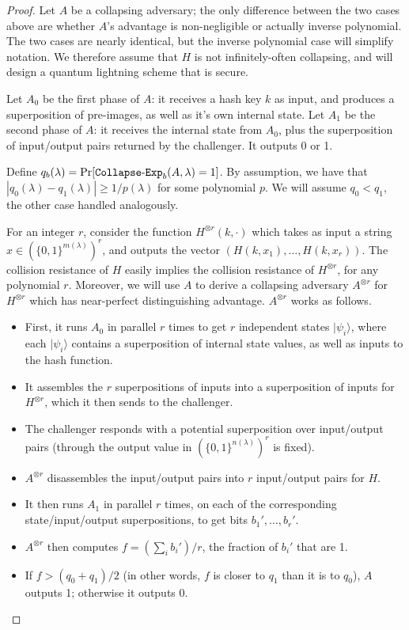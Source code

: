 \begin{proof} Let $A$ be a collapsing adversary; the only difference between the two cases above are whether $A$'s advantage is non-negligible or actually inverse polynomial.  The two cases are nearly identical, but the inverse polynomial case will simplify notation.  We therefore assume that $H$ is not infinitely-often collapsing, and will design a quantum lightning scheme that is secure.
	
Let $A_0$ be the first phase of $A$: it receives a hash key $k$ as input, and produces a superposition of pre-images, as well as it's own internal state.  Let $A_1$ be the second phase of $A$: it receives the internal state from $A_0$, plus the superposition of input/output pairs returned by the challenger.  It outputs 0 or 1.	

Define $q_b(\lambda)=\Pr[{\tt{Collapse\text{-}Exp}}_b(A,\lambda)=1]$.  By assumption, we have that $|q_0(\lambda)-q_1(\lambda)|\geq 1/p(\lambda)$ for some polynomial $p$.  We will assume $q_0<q_1$, the other case handled analogously.  

For an integer $r$, consider the function $H^{\otimes r}(k,\cdot)$ which takes as input a string $x\in(\{0,1\}^{m(\lambda)})^r$, and outputs the vector $(H(k,x_1),\dots,H(k,x_r))$.  The collision resistance of $H$ easily implies the collision resistance of $H^{\otimes r}$, for any polynomial $r$.  Moreover, we will use $A$ to derive a collapsing adversary $A^{\otimes r}$ for $H^{\otimes r}$ which has near-perfect distinguishing advantage.  $A^{\otimes r}$ works as follows.

\begin{itemize}
	\item First, it runs $A_0$ in parallel $r$ times to get $r$ independent states $|\psi_i\rangle$, where each $|\psi_i\rangle$ contains a superposition of internal state values, as well as inputs to the hash function.
	\item It assembles the $r$ superpositions of inputs into a superposition of inputs for $H^{\otimes r}$, which it then sends to the challenger.
	\item The challenger responds with a potential superposition over input/output pairs (through the output value in $(\{0,1\}^{n(\lambda)})^r$ is fixed).  
	\item $A^{\otimes r}$ disassembles the input/output pairs into $r$ input/output pairs for $H$.  
	\item It then runs $A_1$ in parallel $r$ times, on each of the corresponding state/input/output superpositions, to get bits $b_1',\dots,b_r'$.
	\item $A^{\otimes r}$ then computes $f=(\sum_i b_i')/r$, the fraction of $b_i'$ that are 1.
	\item If $f>(q_0+q_1)/2$ (in other words, $f$ is closer to $q_1$ than it is to $q_0$), $A$ outputs 1; otherwise it outputs 0.
\end{itemize}


\end{proof}
